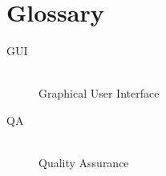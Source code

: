 \newpage
\section{Glossary}

\begin{description}
\item[GUI]\hfill \\ Graphical User Interface
\item[QA]\hfill \\ Quality Assurance
\end{description}